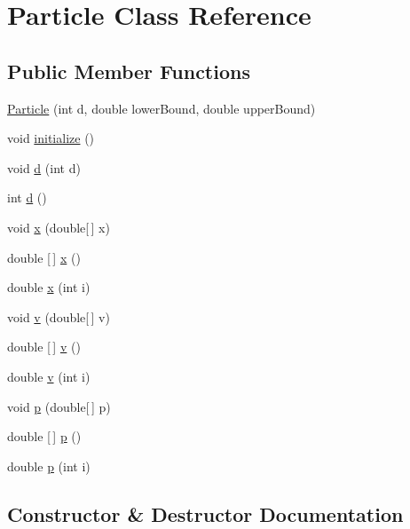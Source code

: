 \hypertarget{class_particle}{}\section{Particle Class Reference}
\label{class_particle}
\subsection*{Public Member Functions}
\begin{DoxyCompactItemize}
\item 
\hyperlink{class_particle_a064c9fe8249ad6ba0109159d9de78aa4}{Particle} (int d, double lower\+Bound, double upper\+Bound)
\item 
void \hyperlink{class_particle_a99f82d52c6e3e0454db2607f768f8cb3}{initialize} ()
\item 
void \hyperlink{class_particle_a6e62ebfe46b1233407c72e5cd1fd7a4b}{d} (int d)
\item 
int \hyperlink{class_particle_ac4efb92ddb9203e588236968d8b7b9be}{d} ()
\item 
void \hyperlink{class_particle_a421fd391e44a79cc2a32cfe635ab9df3}{x} (double\mbox{[}$\,$\mbox{]} x)
\item 
double \mbox{[}$\,$\mbox{]} \hyperlink{class_particle_a4ae274d487a3565fa11d59206c45139d}{x} ()
\item 
double \hyperlink{class_particle_a1298e71228d20427caf49481cd1d0fdf}{x} (int i)
\item 
void \hyperlink{class_particle_ad8901cfd25505e1bb17464d3d9eb03f1}{v} (double\mbox{[}$\,$\mbox{]} v)
\item 
double \mbox{[}$\,$\mbox{]} \hyperlink{class_particle_a82665a73d72400706763a8fe62a4b677}{v} ()
\item 
double \hyperlink{class_particle_aa7e430520821b6650d829f3b51752d01}{v} (int i)
\item 
void \hyperlink{class_particle_af3cd850d81af82f5357492136c7679ab}{p} (double\mbox{[}$\,$\mbox{]} p)
\item 
double \mbox{[}$\,$\mbox{]} \hyperlink{class_particle_add309fe038f8b01ffd812fd574dfeed9}{p} ()
\item 
double \hyperlink{class_particle_a3ffe07f8456b8f145631fe6e9ae01909}{p} (int i)
\end{DoxyCompactItemize}


\subsection{Constructor \& Destructor Documentation}
\mbox{\label{class_particle_a064c9fe8249ad6ba0109159d9de78aa4}} 
